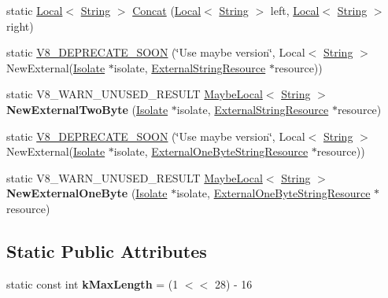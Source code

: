 \begin{DoxyCompactItemize}
\item 
static \hyperlink{classv8_1_1Local}{Local}$<$ \hyperlink{classv8_1_1String}{String} $>$ \hyperlink{classv8_1_1String_ae72b61a78cef5d2916a87d9032c7fd34}{Concat} (\hyperlink{classv8_1_1Local}{Local}$<$ \hyperlink{classv8_1_1String}{String} $>$ left, \hyperlink{classv8_1_1Local}{Local}$<$ \hyperlink{classv8_1_1String}{String} $>$ right)
\item 
static \hyperlink{classv8_1_1String_affb615b7b4aad75d51d60ed1672a6762}{V8\+\_\+\+D\+E\+P\+R\+E\+C\+A\+T\+E\+\_\+\+S\+O\+O\+N} (\char`\"{}Use maybe version\char`\"{}, Local$<$ \hyperlink{classv8_1_1String}{String} $>$ New\+External(\hyperlink{classv8_1_1Isolate}{Isolate} $\ast$isolate, \hyperlink{classv8_1_1String_1_1ExternalStringResource}{External\+String\+Resource} $\ast$resource))
\item 
\hypertarget{classv8_1_1String_ad0491e4a3506df9ef9bfc08fca0d7a34}{}static V8\+\_\+\+W\+A\+R\+N\+\_\+\+U\+N\+U\+S\+E\+D\+\_\+\+R\+E\+S\+U\+L\+T \hyperlink{classv8_1_1MaybeLocal}{Maybe\+Local}$<$ \hyperlink{classv8_1_1String}{String} $>$ {\bfseries New\+External\+Two\+Byte} (\hyperlink{classv8_1_1Isolate}{Isolate} $\ast$isolate, \hyperlink{classv8_1_1String_1_1ExternalStringResource}{External\+String\+Resource} $\ast$resource)\label{classv8_1_1String_ad0491e4a3506df9ef9bfc08fca0d7a34}

\item 
static \hyperlink{classv8_1_1String_ad7186b5cfdddffbee8235a7216f31a67}{V8\+\_\+\+D\+E\+P\+R\+E\+C\+A\+T\+E\+\_\+\+S\+O\+O\+N} (\char`\"{}Use maybe version\char`\"{}, Local$<$ \hyperlink{classv8_1_1String}{String} $>$ New\+External(\hyperlink{classv8_1_1Isolate}{Isolate} $\ast$isolate, \hyperlink{classv8_1_1String_1_1ExternalOneByteStringResource}{External\+One\+Byte\+String\+Resource} $\ast$resource))
\item 
\hypertarget{classv8_1_1String_a43edc2bcb1bf2a06f306ea9554042f24}{}static V8\+\_\+\+W\+A\+R\+N\+\_\+\+U\+N\+U\+S\+E\+D\+\_\+\+R\+E\+S\+U\+L\+T \hyperlink{classv8_1_1MaybeLocal}{Maybe\+Local}$<$ \hyperlink{classv8_1_1String}{String} $>$ {\bfseries New\+External\+One\+Byte} (\hyperlink{classv8_1_1Isolate}{Isolate} $\ast$isolate, \hyperlink{classv8_1_1String_1_1ExternalOneByteStringResource}{External\+One\+Byte\+String\+Resource} $\ast$resource)\label{classv8_1_1String_a43edc2bcb1bf2a06f306ea9554042f24}

\end{DoxyCompactItemize}
\subsection*{Static Public Attributes}
\begin{DoxyCompactItemize}
\item 
\hypertarget{classv8_1_1String_a51272e8a71006385863586afb2bb4a62}{}static const int {\bfseries k\+Max\+Length} = (1 $<$$<$ 28) -\/ 16\label{classv8_1_1String_a51272e8a71006385863586afb2bb4a62}

\end{DoxyCompactItemize}


